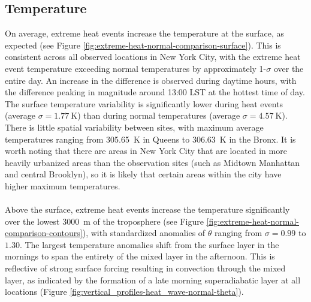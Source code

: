 \subsection{Temperature}
On average, extreme heat events increase the temperature at the surface, as expected (see Figure \ref{fig:extreme-heat-normal-comparison-surface}). This is consistent across all observed locations in New York City, with the extreme heat event temperature exceeding normal temperatures by approximately 1-$\sigma$ over the entire day. An increase in the difference is observed during daytime hours, with the difference peaking in magnitude around 13:00 LST at the hottest time of day. The surface temperature variability is significantly lower during heat events (average $ \sigma = \SI{1.77}{\kelvin} $) than during normal temperatures (average $ \sigma = \SI{4.57}{\kelvin} $). There is little spatial variability between sites, with maximum average temperatures ranging from \SI{305.65}{\kelvin} in Queens to \SI{306.63}{\kelvin} in the Bronx. It is worth noting that there are areas in New York City that are located in more heavily urbanized areas than the observation sites (such as Midtown Manhattan and central Brooklyn), so it is likely that certain areas within the city have higher maximum temperatures. 
\\ \\
Above the surface, extreme heat events increase the temperature significantly over the lowest \SI{3000}{\meter} of the troposphere (see Figure \ref{fig:extreme-heat-normal-comparison-contours}), with standardized anomalies of $\theta$ ranging from $\sigma = 0.99$ to $1.30$. The largest temperature anomalies shift from the surface layer in the mornings to span the entirety of the mixed layer in the afternoon. This is reflective of strong surface forcing resulting in convection through the mixed layer, as indicated by the formation of a late morning superadiabatic layer at all locations (Figure \ref{fig:vertical_profiles-heat_wave-normal-theta}). 
\\ \\
